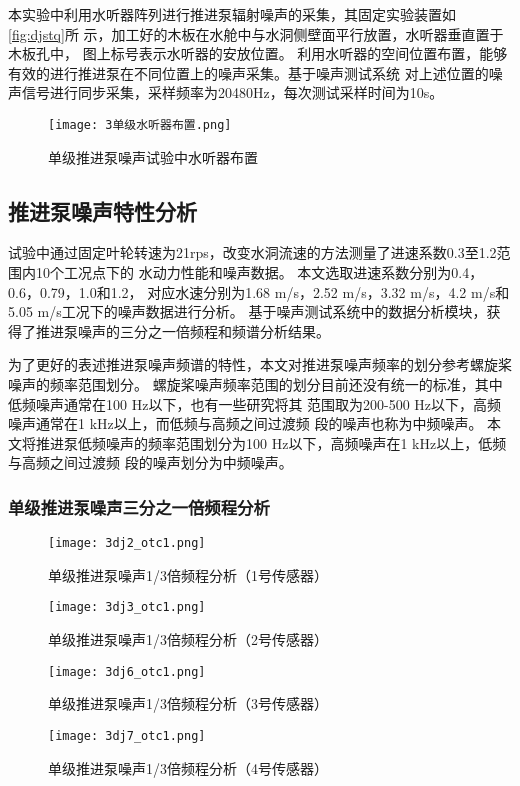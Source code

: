 本实验中利用水听器阵列进行推进泵辐射噪声的采集，其固定实验装置如\autoref{fig:djstq}所
示，加工好的木板在水舱中与水洞侧壁面平行放置，水听器垂直置于木板孔中，
图上标号表示水听器的安放位置。
利用水听器的空间位置布置，能够有效的进行推进泵在不同位置上的噪声采集。基于噪声测试系统
对上述位置的噪声信号进行同步采集，采样频率为20480Hz，每次测试采样时间为10s。
\begin{figure}[htbp]
    \centering
    \texttt{[image: 3单级水听器布置.png]}
    \caption{\label{fig:djstq}单级推进泵噪声试验中水听器布置}
\end{figure}
\subsection{推进泵噪声特性分析}
试验中通过固定叶轮转速为21rps，改变水洞流速的方法测量了进速系数0.3至1.2范围内10个工况点下的
水动力性能和噪声数据。
本文选取进速系数分别为0.4，0.6，0.79，1.0和1.2，
对应水速分别为1.68 m/s，2.52 m/s，3.32 m/s，4.2 m/s和5.05 m/s工况下的噪声数据进行分析。
基于噪声测试系统中的数据分析模块，获得了推进泵噪声的三分之一倍频程和频谱分析结果。

为了更好的表述推进泵噪声频谱的特性，本文对推进泵噪声频率的划分参考螺旋桨噪声的频率范围划分。
螺旋桨噪声频率范围的划分目前还没有统一的标准，其中
低频噪声通常在100 Hz以下，也有一些研究将其
范围取为200-500 Hz以下，高频噪声通常在1 kHz以上，而低频与高频之间过渡频
段的噪声也称为中频噪声\cite{xuye2019a}。
本文将推进泵低频噪声的频率范围划分为100 Hz以下，高频噪声在1 kHz以上，低频与高频之间过渡频
段的噪声划分为中频噪声。
\subsubsection{单级推进泵噪声三分之一倍频程分析}
\begin{figure}[htbp]
    \centering
    \texttt{[image: 3dj2\_otc1.png]}
    \caption{\label{fig:djotc1}单级推进泵噪声1/3倍频程分析（1号传感器）}
\end{figure}
\begin{figure}[htbp]
    \centering
    \texttt{[image: 3dj3\_otc1.png]}
    \caption{\label{fig:djotc2}单级推进泵噪声1/3倍频程分析（2号传感器）}
\end{figure}
\begin{figure}[htbp]
    \centering
    \texttt{[image: 3dj6\_otc1.png]}
    \caption{\label{fig:djotc3}单级推进泵噪声1/3倍频程分析（3号传感器）}
\end{figure}
\begin{figure}[htbp]
    \centering
    \texttt{[image: 3dj7\_otc1.png]}
    \caption{\label{fig:djotc4}单级推进泵噪声1/3倍频程分析（4号传感器）}
\end{figure}

